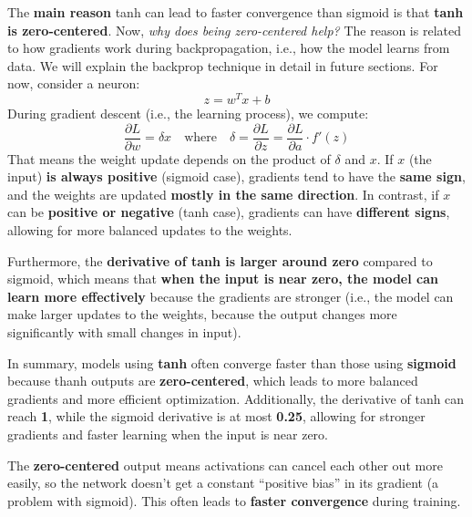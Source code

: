 \begin{deepeningbox}
    The \textbf{main reason} tanh can lead to faster convergence than sigmoid is that \textbf{tanh is zero-centered}. Now, \emph{why does being zero-centered help?} The reason is related to how gradients work during backpropagation, i.e., how the model learns from data. We will explain the backprop technique in detail in future sections. For now, consider a neuron:
    \begin{equation*}
        z = w^{T} x + b
    \end{equation*}
    During gradient descent (i.e., the learning process), we compute:
    \begin{equation*}
        \dfrac{\partial L}{\partial w} = \delta x \quad \text{where} \quad \delta = \dfrac{\partial L}{\partial z} = \dfrac{\partial L}{\partial a} \cdot f'(z)
    \end{equation*}
    That means the weight update depends on the product of $\delta$ and $x$. If $x$ (the input) \textbf{is always positive} (sigmoid case), gradients tend to have the \textbf{same sign}, and the weights are updated \textbf{mostly in the same direction}. In contrast, if $x$ can be \textbf{positive or negative} (tanh case), gradients can have \textbf{different signs}, allowing for more balanced updates to the weights.

    \highspace
    Furthermore, the \textbf{derivative of tanh is larger around zero} compared to sigmoid, which means that \textbf{when the input is near zero, the model can learn more effectively} because the gradients are stronger (i.e., the model can make larger updates to the weights, because the output changes more significantly with small changes in input).

    \highspace
    In summary, models using \textbf{tanh} often converge faster than those using \textbf{sigmoid} because thanh outputs are \textbf{zero-centered}, which leads to more balanced gradients and more efficient optimization. Additionally, the derivative of tanh can reach \textbf{1}, while the sigmoid derivative is at most \textbf{0.25}, allowing for stronger gradients and faster learning when the input is near zero.
\end{deepeningbox}
The \textbf{zero-centered} output means activations can cancel each other out more easily, so the network doesn't get a constant ``positive bias'' in its gradient (a problem with sigmoid). This often leads to \textbf{faster convergence} during training.


